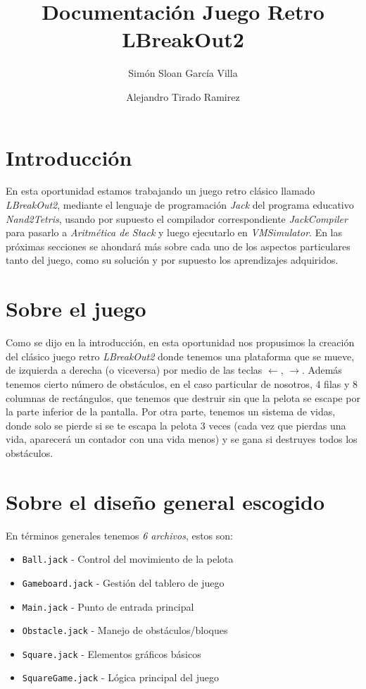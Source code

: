 \documentclass[twocolumn]{article}
\title{Documentación Juego Retro LBreakOut2}
\author{Simón Sloan García Villa \and Alejandro Tirado Ramirez}
\begin{document}
	\maketitle
	\tableofcontents
	
	\section{Introducción}
	En esta oportunidad estamos trabajando un juego retro clásico llamado \emph{LBreakOut2}, mediante el lenguaje de programación \emph{Jack} del programa educativo \emph{Nand2Tetris}, usando por supuesto el compilador correspondiente \emph{JackCompiler} para pasarlo a \emph{Aritmética de Stack} y luego ejecutarlo en \emph{VMSimulator}. En las próximas secciones se ahondará más sobre cada uno de los aspectos particulares tanto del juego, como su solución y por supuesto los aprendizajes adquiridos.
	
	\section{Sobre el juego}
	Como se dijo en la introducción, en esta oportunidad nos propusimos la creación del clásico juego retro \emph{LBreakOut2} donde tenemos una plataforma que se mueve, de izquierda a derecha (o viceversa) por medio de las teclas $\leftarrow$, $\rightarrow$. Además tenemos cierto número de obstáculos, en el caso particular de nosotros, 4 filas y 8 columnas de rectángulos, que tenemos que destruir sin que la pelota se escape por la parte inferior de la pantalla. Por otra parte, tenemos un sistema de vidas, donde solo se pierde si se te escapa la pelota 3 veces (cada vez que pierdas una vida, aparecerá un contador con una vida menos) y se gana si destruyes todos los obstáculos.
	
	\section{Sobre el diseño general escogido}
	En términos generales tenemos \emph{6 archivos}, estos son: 
	\begin{itemize}
		\item \texttt{Ball.jack} - Control del movimiento de la pelota
		\item \texttt{Gameboard.jack} - Gestión del tablero de juego
		\item \texttt{Main.jack} - Punto de entrada principal
		\item \texttt{Obstacle.jack} - Manejo de obstáculos/bloques
		\item \texttt{Square.jack} - Elementos gráficos básicos
		\item \texttt{SquareGame.jack} - Lógica principal del juego
	\end{itemize}
	
\end{document}
